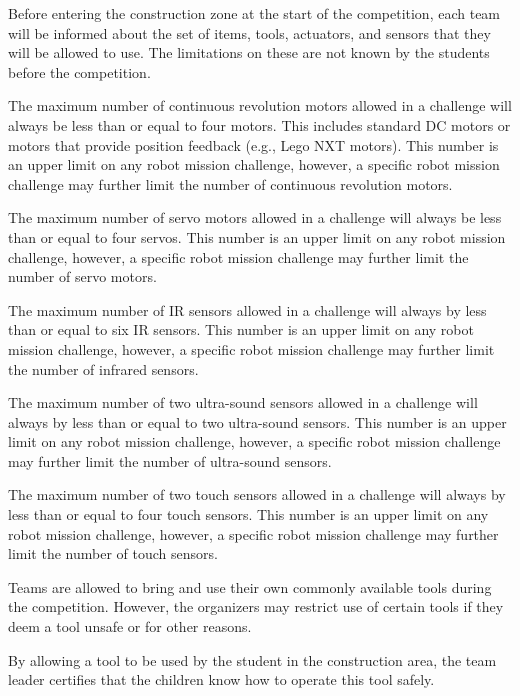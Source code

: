 \documentclass[12pt]{hurocup}
\begin{document}
\label{law-iteams-and-tools}

\begin{lawlist}[JC]

\item \label{l-items} Before entering the construction zone at the
  start of the competition, each team will be informed about the set
  of items, tools, actuators, and sensors that they will be allowed to
  use. The limitations on these are not known by the students before
  the competition.

\item \label{l-actuators} The maximum number of continuous revolution
  motors allowed in a challenge will always be less than or equal to
  four motors. This includes standard DC motors or motors that provide
  position feedback (e.g., Lego NXT motors). This number is an upper
  limit on any robot mission challenge, however, a specific robot
  mission challenge may further limit the number of continuous
  revolution motors.

\item \label{l-servos} The maximum number of servo motors allowed
  in a challenge will always be less than or equal to four
  servos. This number is an upper limit on any robot mission
  challenge, however, a specific robot mission challenge may further
  limit the number of servo motors.

\item \label{l-infrared} The maximum number of IR sensors allowed in a
  challenge will always by less than or equal to six IR sensors. This
  number is an upper limit on any robot mission challenge, however, a
  specific robot mission challenge may further limit the number of
  infrared sensors.

\item \label{l-ultrasound} The maximum number of two ultra-sound
  sensors allowed in a challenge will always by less than or equal to
  two ultra-sound sensors. This number is an upper limit on any robot
  mission challenge, however, a specific robot mission challenge may
  further limit the number of ultra-sound sensors.

\item \label{l-touch} The maximum number of two touch sensors allowed
  in a challenge will always by less than or equal to four touch
  sensors. This number is an upper limit on any robot mission
  challenge, however, a specific robot mission challenge may further
  limit the number of touch sensors.

\item \label{l-tools} Teams are allowed to bring and use their own
  commonly available tools during the competition. However, the
  organizers may restrict use of certain tools if they deem a tool
  unsafe or for other reasons.

\item \label{l-handling} By allowing a tool to be used by the student
  in the construction area, the team leader certifies that the
  children know how to operate this tool safely.
\end{lawlist}
\end{document}

